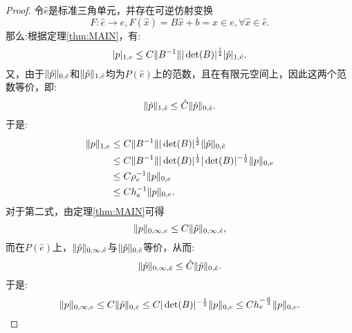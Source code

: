 \begin{proof}
    令$\hat{e}$是标准三角单元，并存在可逆仿射变换
    \begin{equation}
        F:\hat{e}\rightarrow e, F(\hat{x})=B\hat{x}+b=x\in e,\forall\hat{x}\in\hat{e}.
    \end{equation}
    那么:根据定理\ref{thm:MAIN}，有:
    \begin{equation}
        |p|_{1,e}\le C\|B^{-1}\||\det(B)|^{\frac{1}{2}}|\hat{p}|_{1,\hat{e}}.
    \end{equation}
    又，由于$\|\hat{p}\|_{0,\hat{e}}$和$\|\hat{p}\|_{1,\hat{e}}$均为$P(\hat{e})$上的范数，且在有限元空间上，因此这两个范数等价，即:
    \begin{equation}
        \|\hat{p}\|_{1,\hat{e}}\le \hat{C}\|\hat{p}\|_{0,\hat{e}}.
    \end{equation}
    于是:
    \begin{equation}
        \begin{aligned}
            \|p\|_{1,e}&\le C\|B^{-1}\||\det(B)|^{\frac{1}{2}}\|\hat{p}\|_{0,\hat{e}}\\
            &\le C\|B^{-1}\||\det(B)|^{\frac{1}{2}}|\det(B)|^{-\frac{1}{2}}\|p\|_{0,e}\\
            &\le C\rho_{e}^{-1}\|p\|_{0,e}\\
            &\le Ch_{e}^{-1}\|p\|_{0,e}.
        \end{aligned}
    \end{equation}
    对于第二式，由定理\ref{thm:MAIN}可得
    \begin{equation}
        \|p\|_{0,\infty,e}\le C\|\hat{p}\|_{0,\infty,\hat{e}},
    \end{equation}
    而在$P(\hat{e})$上，$\|\hat{p}\|_{0,\infty,\hat{e}}$与$\|\hat{p}\|_{0,\hat{e}}$等价，从而:
    \begin{equation}
        \|\hat{p}\|_{0,\infty,\hat{e}}\le\hat{C}\|\hat{p}\|_{0,\hat{e}}.
    \end{equation}
    于是:
    \begin{equation}
        \|p\|_{0,\infty,e}\le C\|\hat{p}\|_{0,\hat{e}}\le C|\det(B)|^{-\frac{1}{2}}\|p\|_{0,e}\le Ch_{e}^{-\frac{n}{2}}\|p\|_{0,e}.
    \end{equation}
\end{proof}
